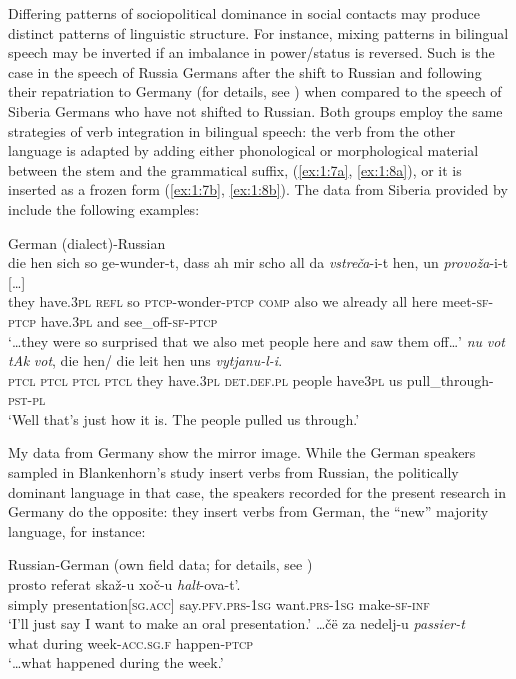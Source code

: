 Differing patterns of sociopolitical dominance in social contacts may produce distinct patterns of linguistic structure. For instance, mixing patterns in bilingual speech may be inverted if an imbalance in power/status is reversed. Such is the case in the speech of Russia Germans after the shift to Russian and following their repatriation to Germany (for details, see ) when compared to the speech of Siberia Germans who have not shifted to Russian. Both groups employ the same strategies of verb integration in bilingual speech: the verb from the other language is adapted by adding either phonological or morphological material between the stem and the grammatical suffix, (\ref{ex:1:7a}, \ref{ex:1:8a}), or it is inserted as a frozen form (\ref{ex:1:7b}, \ref{ex:1:8b}). The data from Siberia provided by \citet[][]{blankenhorn} include the following examples:

\ea
German (dialect)-Russian \citep[][103, 93]{blankenhorn}\\
\ea{\label{ex:1:7a}}
\gll [\dots] die hen sich so ge-wunder-t, dass ah mir scho all da \textit{vstreča}-i-t hen, un \textit{provoža}-i-t [\dots] \\
    {} they have.\textsc{3pl} \textsc{refl} so \textsc{ptcp}-wonder-\textsc{ptcp} \textsc{comp} also we already all here 
    meet-\textsc{sf-ptcp} have.\textsc{3pl} and see\_off-\textsc{sf-ptcp}\\
\glt `\dots they were so surprised that we also met people here and saw them off\dots'
\ex{\label{ex:1:7b}}
\gll [\dots] \textit{nu} \textit{vot} \textit{tAk} \textit{vot}, die hen/ die leit hen uns \textit{vytjanu-l-i}.\\
	{} \textsc{ptcl} \textsc{ptcl} \textsc{ptcl} \textsc{ptcl} they have.\textsc{3pl} \textsc{det.def.pl} people have\textsc{3pl} us pull\_through-\textsc{pst-pl}\\
\glt `Well that's just how it is. The people pulled us through.'
\z
\z

\noindent My data from Germany show the mirror image. While the German speakers sampled in Blankenhorn's \citeyear[][]{blankenhorn} study insert verbs from Russian, the politically dominant language in that case, the speakers recorded for the present research in Germany do the opposite: they insert verbs from German, the ``new'' majority language, for instance:

\ea
Russian-German (own field data; for details, see )\\
\ea{\label{ex:1:8a}}
\gll prosto referat skaž-u xoč-u \textit{halt}-ova-t’.\\
	simply presentation[\textsc{sg.acc}] say.\textsc{pfv.prs-1sg} want.\textsc{prs-1sg}   make-\textsc{sf-inf}\\
\glt `I'll just say I want to make an oral presentation.'
\ex{\label{ex:1:8b}}
\gll \dots čë za nedelj-u \textit{passier-t}\\
    what during week-\textsc{acc.sg.f} happen-\textsc{ptcp}\\
\glt `\dots what happened during the week.'
\z
\z

